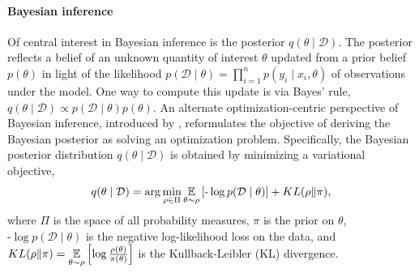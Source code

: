 \paragraph{Bayesian inference}
Of central interest in Bayesian inference is the posterior $q(\theta \mid \mathcal{D})$. 
The posterior reflects a belief of an unknown quantity of interest $\theta$ updated from a prior belief $p(\theta)$ in light of the likelihood $p(\mathcal{D} \mid \theta) = \prod_{i=1}^n p(y_i \mid x_i, \theta)$ of observations under the model.
One way to compute this update is via Bayes' rule, $q(\theta \mid \mathcal{D}) \propto p(\mathcal{D} \mid \theta) p(\theta)$.
An alternate optimization-centric perspective of Bayesian inference, introduced by \citet{csiszar1975divergence,donsker1983asymptotic},
reformulates the objective of deriving the Bayesian posterior as solving an optimization problem. 
Specifically, the Bayesian posterior distribution $q(\theta \mid \mathcal{D})$ is obtained by minimizing a variational objective,
\begin{align}
	q(\theta \mid \mathcal{D}) = \arg\min_{\rho \in \Pi} \underset{\theta \sim \rho}{\mathbb{E}}\left[\text{-}\log p(\mathcal{D} \mid \theta)\right] + KL(\rho \Vert \pi), \label{eq:general_vi}
\end{align} 
where $\Pi$ is the space of all probability measures, $\pi$ is the prior on $\theta$, $\text{-}\log p(\mathcal{D} \mid \theta)$ is the negative log-likelihood loss on the data, and $KL(\rho \Vert \pi) =  \underset{\theta \sim \rho}{\mathbb{E}}\left[\log \frac{\rho(\theta)}{\pi(\theta)}\right]$ is the Kullback-Leibler (KL) divergence. 

